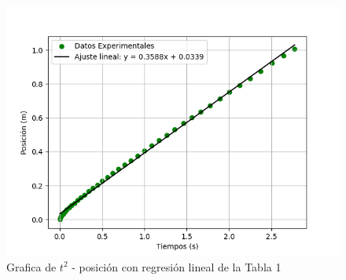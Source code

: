 \documentclass[12pt,a4paper]{article}
\begin{document}
\begin{figure}[h!]
\centering
\includegraphics[scale=1]{20 g r.png}
\caption{Grafica de $t^2$ - posición con regresión lineal de la Tabla 1}
\end{figure}

\clearpage
\end{document}
